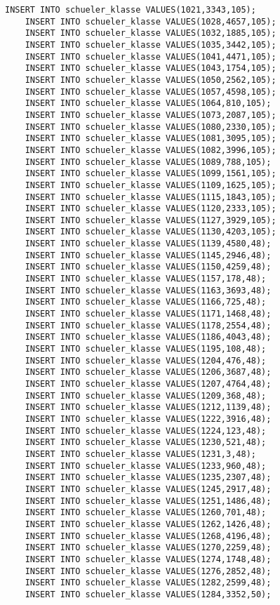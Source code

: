 \begin{lstlisting}[breaklines=True, numbers=none, basicstyle=\tiny, keepspaces=false]
	INSERT INTO schueler_klasse VALUES(1021,3343,105);
	INSERT INTO schueler_klasse VALUES(1028,4657,105);
	INSERT INTO schueler_klasse VALUES(1032,1885,105);
	INSERT INTO schueler_klasse VALUES(1035,3442,105);
	INSERT INTO schueler_klasse VALUES(1041,4471,105);
	INSERT INTO schueler_klasse VALUES(1043,1754,105);
	INSERT INTO schueler_klasse VALUES(1050,2562,105);
	INSERT INTO schueler_klasse VALUES(1057,4598,105);
	INSERT INTO schueler_klasse VALUES(1064,810,105);
	INSERT INTO schueler_klasse VALUES(1073,2087,105);
	INSERT INTO schueler_klasse VALUES(1080,2330,105);
	INSERT INTO schueler_klasse VALUES(1081,3095,105);
	INSERT INTO schueler_klasse VALUES(1082,3996,105);
	INSERT INTO schueler_klasse VALUES(1089,788,105);
	INSERT INTO schueler_klasse VALUES(1099,1561,105);
	INSERT INTO schueler_klasse VALUES(1109,1625,105);
	INSERT INTO schueler_klasse VALUES(1115,1843,105);
	INSERT INTO schueler_klasse VALUES(1120,2333,105);
	INSERT INTO schueler_klasse VALUES(1127,3929,105);
	INSERT INTO schueler_klasse VALUES(1130,4203,105);
	INSERT INTO schueler_klasse VALUES(1139,4580,48);
	INSERT INTO schueler_klasse VALUES(1145,2946,48);
	INSERT INTO schueler_klasse VALUES(1150,4259,48);
	INSERT INTO schueler_klasse VALUES(1157,178,48);
	INSERT INTO schueler_klasse VALUES(1163,3693,48);
	INSERT INTO schueler_klasse VALUES(1166,725,48);
	INSERT INTO schueler_klasse VALUES(1171,1468,48);
	INSERT INTO schueler_klasse VALUES(1178,2554,48);
	INSERT INTO schueler_klasse VALUES(1186,4043,48);
	INSERT INTO schueler_klasse VALUES(1195,108,48);
	INSERT INTO schueler_klasse VALUES(1204,476,48);
	INSERT INTO schueler_klasse VALUES(1206,3687,48);
	INSERT INTO schueler_klasse VALUES(1207,4764,48);
	INSERT INTO schueler_klasse VALUES(1209,368,48);
	INSERT INTO schueler_klasse VALUES(1212,1139,48);
	INSERT INTO schueler_klasse VALUES(1222,3916,48);
	INSERT INTO schueler_klasse VALUES(1224,123,48);
	INSERT INTO schueler_klasse VALUES(1230,521,48);
	INSERT INTO schueler_klasse VALUES(1231,3,48);
	INSERT INTO schueler_klasse VALUES(1233,960,48);
	INSERT INTO schueler_klasse VALUES(1235,2307,48);
	INSERT INTO schueler_klasse VALUES(1245,2917,48);
	INSERT INTO schueler_klasse VALUES(1251,1486,48);
	INSERT INTO schueler_klasse VALUES(1260,701,48);
	INSERT INTO schueler_klasse VALUES(1262,1426,48);
	INSERT INTO schueler_klasse VALUES(1268,4196,48);
	INSERT INTO schueler_klasse VALUES(1270,2259,48);
	INSERT INTO schueler_klasse VALUES(1274,1748,48);
	INSERT INTO schueler_klasse VALUES(1276,2852,48);
	INSERT INTO schueler_klasse VALUES(1282,2599,48);
	INSERT INTO schueler_klasse VALUES(1284,3352,50);

\end{lstlisting}
